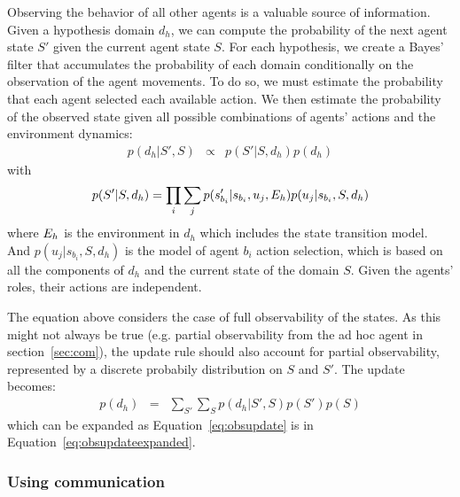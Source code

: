 Observing the behavior of all other agents is a valuable source of information. Given a hypothesis domain $d_h$, we can compute the probability of the next agent state $S'$ given the current agent state $S$. For each hypothesis, we create a Bayes' filter that accumulates the probability of each domain conditionally on the observation of the agent movements.
To do so, we must estimate the probability that each agent selected each available action. We then estimate the probability of the observed state given all possible combinations of agents' actions and the environment dynamics:
%
\begin{eqnarray}
p(d_h|S',S) &\propto& p(S'|S,d_h) p(d_h)
\label{eq:obsupdate}
\end{eqnarray}
%
with
%
\begin{eqnarray}
p(S'|S,d_h) = \prod_i \sum_j p(s'_{b_i}|s_{b_i},u_j,E_h) p(u_j|s_{b_i}, S, d_h)
\label{eq:obsupdateexpanded}
\end{eqnarray}
%
where $E_h$ is the environment in $d_h$ which includes the state transition model. And $p(u_j|s_{b_i}, S, d_h)$ is the model of agent $b_i$ action selection, which is based on all the components of $d_h$ and the current state of the domain $S$. Given the agents' roles, their actions are independent. %

The equation above considers the case of full observability of the states. As this might not always be true (e.g. partial observability from the ad hoc agent in section~\ref{sec:com}), the update rule should also account for partial observability, represented by a discrete probabily distribution on $S$ and $S'$. The update becomes:
%
\begin{eqnarray}
p(d_h) &=& \sum_{S'} \sum_S p(d_h|S',S) p(S') p(S)
\label{eq:obsupdatestateprob}
\end{eqnarray}
%
which can be expanded as Equation~\ref{eq:obsupdate} is in Equation~\ref{eq:obsupdateexpanded}.

\subsubsection{Using communication}

